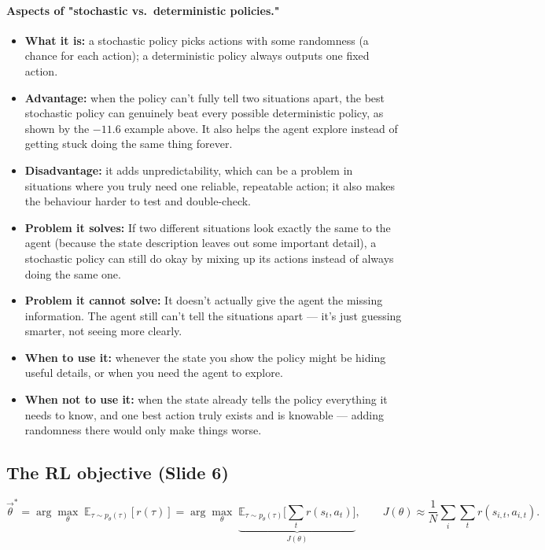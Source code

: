 \documentclass[11pt]{article}
\begin{document}
\paragraph{Aspects of "stochastic vs.\ deterministic policies."}
\begin{itemize}[leftmargin=*]
  \item \textbf{What it is:} a stochastic policy picks actions with some randomness (a chance for each action); a deterministic policy always outputs one fixed action.
  \item \textbf{Advantage:} when the policy can't fully tell two situations apart, the best stochastic policy can genuinely beat every possible deterministic policy, as shown by the $-11.6$ example above. It also helps the agent explore instead of getting stuck doing the same thing forever.
  \item \textbf{Disadvantage:} it adds unpredictability, which can be a problem in situations where you truly need one reliable, repeatable action; it also makes the behaviour harder to test and double-check.
  \item \textbf{Problem it solves:} If two different situations look exactly the same to the agent (because the state description leaves out some important detail), a stochastic policy can still do okay by mixing up its actions instead of always doing the same one.
  \item \textbf{Problem it cannot solve:} It doesn't actually give the agent the missing information. The agent still can't tell the situations apart — it's just guessing smarter, not seeing more clearly.
  \item \textbf{When to use it:} whenever the state you show the policy might be hiding useful details, or when you need the agent to explore.
  \item \textbf{When not to use it:} when the state already tells the policy everything it needs to know, and one best action truly exists and is knowable --- adding randomness there would only make things worse.
\end{itemize}

\subsection{The RL objective (Slide 6)}

$$\vec\theta^{*} = \arg\max_\theta \; \mathbb{E}_{\tau\sim p_\theta(\tau)}[r(\tau)] = \arg\max_\theta \; \underbrace{\mathbb{E}_{\tau\sim p_\theta(\tau)}\Big[\sum_t r(s_t,a_t)\Big]}_{J(\theta)}, \qquad J(\theta) \approx \frac{1}{N}\sum_i\sum_t r(s_{i,t},a_{i,t}).$$
\end{document}
